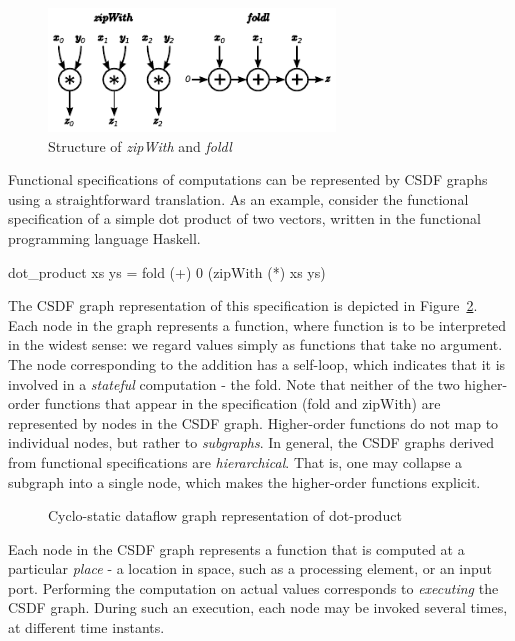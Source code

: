 \documentclass[journal]{IEEEtran}
\begin{document}
  \begin{figure}[h!]
    \centering
    \includegraphics[width=3in]{HOFs}
    \caption{Structure of \emph{zipWith} and \emph{foldl}}
    \label{fig:zipwthandfoldlstruct}
  \end{figure}

  Functional specifications of computations can be represented by CSDF graphs using a straightforward translation.
  As an example, consider the functional specification of a simple dot product of two vectors, written in the functional programming language Haskell.

dot\_product xs ys = fold (+) 0 (zipWith (*) xs ys)

  The CSDF graph representation of this specification is depicted in Figure~\ref{fig:csdf-dotproduct}.
  Each node in the graph represents a function, where function is to be interpreted in the widest sense: we regard values simply as functions that take no argument.
  The node corresponding to the addition has a self-loop, which indicates that it is involved in a \emph{stateful} computation - the fold.
  Note that neither of the two higher-order functions that appear in the specification (fold and zipWith) are represented by nodes in the CSDF graph.
  Higher-order functions do not map to individual nodes, but rather to \emph{subgraphs}.
  In general, the CSDF graphs derived from functional specifications are \emph{hierarchical}.
  That is, one may collapse a subgraph into a single node, which makes the higher-order functions explicit.
  \begin{figure}[h!]
    \centering
    
    \caption{Cyclo-static dataflow graph representation of dot-product}
    \label{fig:csdf-dotproduct}
  \end{figure}

  Each node in the CSDF graph represents a function that is computed at a particular \emph{place} - a location in space, such as a processing element, or an input port.
  Performing the computation on actual values corresponds to \emph{executing} the CSDF graph.
  During such an execution, each node may be invoked several times, at different time instants.
\end{document}
